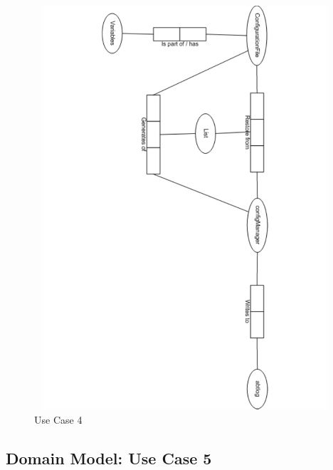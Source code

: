 \begin{figure}[htbp]
  \centering
  \includegraphics[angle=90,width=15cm,height=15cm]{"domainmodel-usecase4"}
  \caption{Use Case 4}
  \label{fig:usecase4}
\end{figure}

\newpage
\subsection{Domain Model: Use Case 5}

